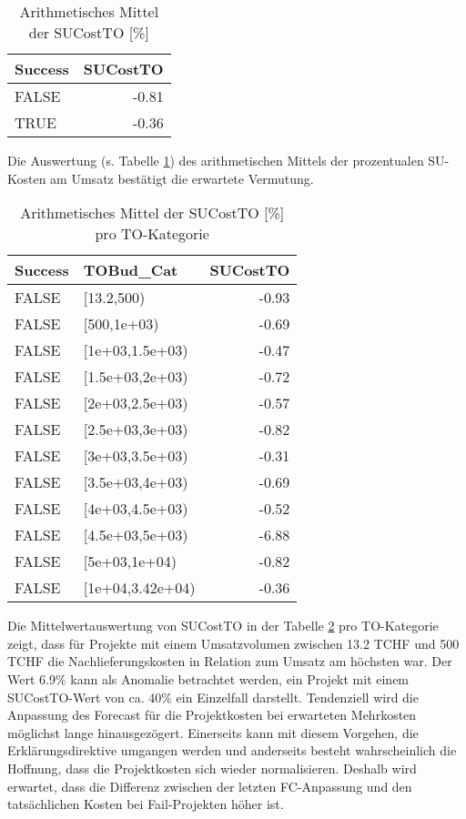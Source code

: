 \begin{table}[H]
	\centering
	\caption{Arithmetisches Mittel der SUCostTO [\%]}
	\begin{tabular}{lr}
		\textbf{Success} & \multicolumn{1}{l}{\textbf{SUCostTO}} \\\hline
		FALSE & -0.81 \\
		TRUE  & -0.36 \\
	\end{tabular}%
	\label{msu}%
\end{table}%
Die Auswertung (s. Tabelle \ref{msu}) des arithmetischen Mittels der prozentualen SU-Kosten am Umsatz bestätigt die erwartete Vermutung.
\begin{table}[H]
	\centering
	\caption{Arithmetisches Mittel der SUCostTO [\%] pro TO-Kategorie}
	\begin{tabular}{llr}
		\textbf{Success} & \textbf{TOBud\_Cat} & \multicolumn{1}{l}{\textbf{SUCostTO}} \\\hline
		FALSE & [13.2,500) & -0.93 \\
		FALSE & [500,1e+03) & -0.69 \\
		FALSE & [1e+03,1.5e+03) & -0.47 \\
		FALSE & [1.5e+03,2e+03) & -0.72 \\
		FALSE & [2e+03,2.5e+03) & -0.57 \\		
		FALSE & [2.5e+03,3e+03) & -0.82 \\
		FALSE & [3e+03,3.5e+03) & -0.31 \\
		FALSE & [3.5e+03,4e+03) & -0.69 \\
		FALSE & [4e+03,4.5e+03) & -0.52 \\
		FALSE & [4.5e+03,5e+03) & -6.88 \\
		FALSE & [5e+03,1e+04) & -0.82 \\
		FALSE & [1e+04,3.42e+04) & -0.36 \\
	\end{tabular}%
	\label{msutocat}%
\end{table}%
Die Mittelwertauswertung von SUCostTO in der Tabelle \ref{msutocat} pro TO-Kategorie zeigt, dass für Projekte mit einem Umsatzvolumen zwischen 13.2 TCHF und 500 TCHF die Nachlieferungskosten in Relation zum Umsatz am höchsten war. Der Wert 6.9\% kann als Anomalie betrachtet werden, ein Projekt mit einem SUCostTO-Wert von ca. 40\% ein Einzelfall darstellt.
%
%
\newline\newline Tendenziell wird die Anpassung des Forecast für die Projektkosten bei erwarteten Mehrkosten möglichst lange hinausgezögert. Einerseits kann mit diesem Vorgehen, die Erklärungsdirektive umgangen werden und anderseits besteht wahrscheinlich die Hoffnung, dass die Projektkosten sich wieder normalisieren. Deshalb wird erwartet, dass die Differenz zwischen der letzten FC-Anpassung und den tatsächlichen Kosten bei Fail-Projekten höher ist. 
